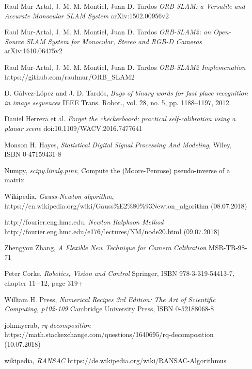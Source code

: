 \documentclass[11pt,a4paper,titlepage,oneside]{report}
\begin{document}
\begin{thebibliography}{1}

  Raul Mur-Artal, J. M. M. Montiel, Juan D. Tardos
  \textit{ORB-SLAM: a Versatile and Accurate Monocular SLAM System}
  arXiv:1502.00956v2

  Raul Mur-Artal, J. M. M. Montiel, Juan D. Tardos
  \textit{ORB-SLAM2: an Open-Source SLAM System for Monocular, Stereo and RGB-D Cameras}
	arXiv:1610.06475v2 

  Raul Mur-Artal, J. M. M. Montiel, Juan D. Tardos
  \textit{ORB-SLAM2 Implemenation}
	https://github.com/raulmur/ORB\_SLAM2

	D. Gálvez-López and J. D. Tardós,
	\textit{Bags of binary words for fast place recognition in image sequences}
	IEEE Trans. Robot., vol. 28, no. 5, pp. 1188–1197, 2012.


  Daniel Herrera et al.
  \textit{Forget the checkerboard: practical self-calibration using a planar scene}
  doi:10.1109/WACV.2016.7477641

  Monson H. Hayes,
  \textit{Statistical Digital Signal Processing And Modeling},
  Wiley, ISBN 0-47159431-8

  Numpy,
  \textit{scipy.linalg.pinv},
  Compute the (Moore-Penrose) pseudo-inverse of a matrix

  Wikipedia,
  \textit{Gauss-Newton algorithm},
  https://en.wikipedia.org/wiki/Gauss\%E2\%80\%93Newton\_algorithm (08.07.2018)

  http://fourier.eng.hmc.edu,
  \textit{Newton Ralphson Method}
  http://fourier.eng.hmc.edu/e176/lectures/NM/node20.html (09.07.2018)

  Zhengyou Zhang,
  \textit{A Flexible New Technique for Camera Calibration}
  MSR-TR-98-71

	Peter Corke,
	\textit{Robotics, Vision and Control}
	Springer, ISBN 978-3-319-54413-7, chapter 11+12, page 319+

	William H. Press,
	\textit{Numerical Recipes 3rd Edition: The Art of Scientific Computing, p102-109} 
	Cambridge University Press, ISBN 0-52188068-8

	johnnycrab,
	\textit{rq-decomposition} 
	https://math.stackexchange.com/questions/1640695/rq-decomposition (10.07.2018)

	wikipedia,
	\textit{RANSAC}
	https://de.wikipedia.org/wiki/RANSAC-Algorithmus


\end{thebibliography}
\end{document}

